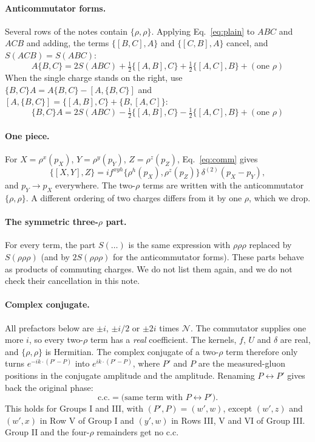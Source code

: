 \documentclass[10pt]{article}
\numberwithin{equation}{section}
\newcommand{\NN}{\mathcal N}
\begin{document}
\paragraph{Anticommutator forms.} Several rows of the notes contain $\{\rho,\rho\}$. Applying Eq.~\eqref{eq:plain} to $ABC$ and $ACB$ and adding, the terms $\{[B,C],A\}$ and $\{[C,B],A\}$ cancel, and $S(ACB)=S(ABC)$:
\begin{equation}
\boxed{\;A\{B,C\}=2S(ABC)+\tfrac12\big\{[A,B],C\big\}+\tfrac12\big\{[A,C],B\big\}+(\text{one }\rho)\;}
\label{eq:Aanti}
\end{equation}
When the single charge stands on the right, use $\{B,C\}A=A\{B,C\}-[A,\{B,C\}]$ and $[A,\{B,C\}]=\{[A,B],C\}+\{B,[A,C]\}$:
\begin{equation}
\boxed{\;\{B,C\}A=2S(ABC)-\tfrac12\big\{[A,B],C\big\}-\tfrac12\big\{[A,C],B\big\}+(\text{one }\rho)\;}
\label{eq:antiA}
\end{equation}
\paragraph{One piece.} For $X=\rho^x(p_X)$, $Y=\rho^y(p_Y)$, $Z=\rho^z(p_Z)$, Eq.~\eqref{eq:comm} gives
\begin{equation}
\big\{[X,Y],Z\big\}=i f^{xyh}\big\{\rho^h(p_X),\rho^z(p_Z)\big\}\,\delta^{(2)}(p_X-p_Y),
\end{equation}
and $p_Y\to p_X$ everywhere. The two-$\rho$ terms are written with the anticommutator $\{\rho,\rho\}$. A different ordering of two charges differs from it by one $\rho$, which we drop.

\paragraph{The symmetric three-$\rho$ part.} For every term, the part $S(\dots)$ is the same expression with $\rho\rho\rho$ replaced by $S(\rho\rho\rho)$ (and by $2S(\rho\rho\rho)$ for the anticommutator forms). These parts behave as products of commuting charges. We do not list them again, and we do not check their cancellation in this note.

\paragraph{Complex conjugate.} All prefactors below are $\pm i$, $\pm i/2$ or $\pm2i$ times $\NN$. The commutator supplies one more $i$, so every two-$\rho$ term has a \emph{real} coefficient. The kernels, $f$, $U$ and $\delta$ are real, and $\{\rho,\rho\}$ is Hermitian. The complex conjugate of a two-$\rho$ term therefore only turns $e^{-ik\cdot(P'-P)}$ into $e^{ik\cdot(P'-P)}$, where $P'$ and $P$ are the measured-gluon positions in the conjugate amplitude and the amplitude. Renaming $P\leftrightarrow P'$ gives back the original phase:
\begin{equation}
\text{c.c.}=\big(\text{same term with }P\leftrightarrow P'\big).
\end{equation}
This holds for Groups I and III, with $(P',P)=(w',w)$, except $(w',z)$ and $(w',x)$ in Row V of Group I and $(y',w)$ in Rows III, V and VI of Group III. Group II and the four-$\rho$ remainders get no c.c.
\end{document}
